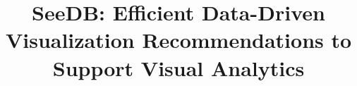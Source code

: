 \documentclass{vldb}
\begin{document}
\newcommand{\srm}[1]{\textcolor{blue}{Sam: #1}}


\title{{\LARGE \sc SeeDB}: Efficient Data-Driven Visualization Recommendations to Support Visual Analytics}

\end{document}
